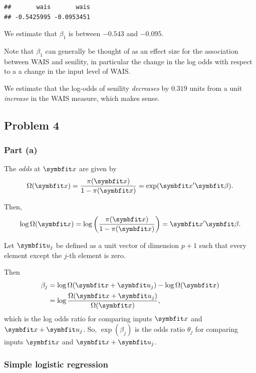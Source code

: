 \documentclass[
  11pt,
]{article}
\begin{document}
\begin{verbatim}
##       wais       wais 
## -0.5425995 -0.0953451
\end{verbatim}

We estimate that \(\beta_1\) is between \(-0.543\) and \(-0.095\).

Note that \(\beta_1\) can generally be thought of as an effect size for
the association between WAIS and senility, in particular the change in
the log odds with respect to a a change in the input level of WAIS.

We estimate that the log-odds of senility \emph{decreases} by \(0.319\)
units from a unit \emph{increase} in the WAIS measure, which makes
sense.

\hypertarget{problem-4}{%
\subsection{Problem 4}\label{problem-4}}

\hypertarget{part-a-2}{%
\subsubsection{Part (a)}\label{part-a-2}}


The \emph{odds} at \(\v{x}\) are given by \[
  \Omega(\v{x}) = \frac{\pi(\v{x})}{1-\pi(\v{x})} = \exp(\v{x}' \v{\beta}).
\]

Then, \[
  \log \Omega(\v{x}) = \log \left(\frac{\pi(\v{x})}{1-\pi(\v{x})}\right) = \v{x}' \v{\beta}.
\]

Let \(\v{u_j}\) be defined as a unit vector of dimension \(p+1\) such
that every element except the \(j\)-th element is zero.

Then \begin{align*}
  \beta_j &= \log \Omega(\v{x}+\v{u_j}) - \log \Omega(\v{x})\\
          &= \log \frac{\Omega(\v{x}+\v{u_j})}{\Omega(\v{x})},
\end{align*} which is the log odds ratio for comparing inputs \(\v{x}\)
and \(\v{x} + \v{u_j}\). So, \(\exp(\beta_j)\) is the odds ratio
\(\theta_j\) for comparing inputs \(\v{x}\) and \(\v{x} + \v{u_j}\).

\hypertarget{simple-logistic-regression}{%
\subsubsection{Simple logistic
regression}\label{simple-logistic-regression}}
\end{document}
